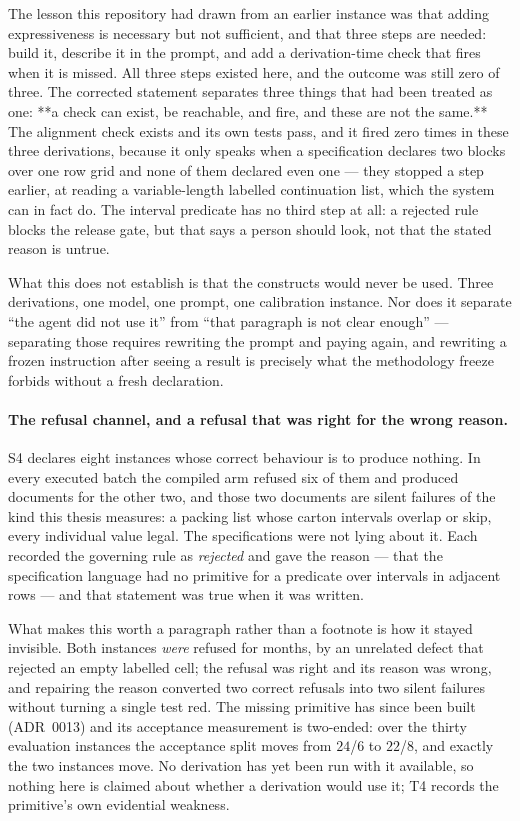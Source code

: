 The lesson this repository had drawn from an earlier instance was that adding expressiveness is
necessary but not sufficient, and that three steps are needed: build it, describe it in the
prompt, and add a derivation-time check that fires when it is missed. All three steps existed
here, and the outcome was still zero of three. The corrected statement separates three things
that had been treated as one: **a check can exist, be reachable, and fire, and these are not the
same.** The alignment check exists and its own tests pass, and it fired zero times in these
three derivations, because it only speaks when a specification declares two blocks over one row
grid and none of them declared even one --- they stopped a step earlier, at reading a
variable-length labelled continuation list, which the system can in fact do. The interval
predicate has no third step at all: a rejected rule blocks the release gate, but that says a
person should look, not that the stated reason is untrue.

What this does not establish is that the constructs would never be used. Three derivations, one
model, one prompt, one calibration instance. Nor does it separate ``the agent did not use it''
from ``that paragraph is not clear enough'' --- separating those requires rewriting the prompt
and paying again, and rewriting a frozen instruction after seeing a result is precisely what the
methodology freeze forbids without a fresh declaration.

\paragraph{The refusal channel, and a refusal that was right for the wrong reason.}
S4 declares eight instances whose correct behaviour is to produce nothing. In every executed
batch the compiled arm refused six of them and produced documents for the other two, and those
two documents are silent failures of the kind this thesis measures: a packing list whose carton
intervals overlap or skip, every individual value legal. The specifications were not lying about
it. Each recorded the governing rule as \emph{rejected} and gave the reason --- that the
specification language had no primitive for a predicate over intervals in adjacent rows --- and
that statement was true when it was written.

What makes this worth a paragraph rather than a footnote is how it stayed invisible. Both
instances \emph{were} refused for months, by an unrelated defect that rejected an empty labelled
cell; the refusal was right and its reason was wrong, and repairing the reason converted two
correct refusals into two silent failures without turning a single test red. The missing
primitive has since been built (ADR~0013) and its acceptance measurement is two-ended: over the
thirty evaluation instances the acceptance split moves from $24$/$6$ to $22$/$8$, and exactly the
two instances move. No derivation has yet been run with it available, so nothing here is claimed
about whether a derivation would use it; T4 records the primitive's own evidential weakness.

